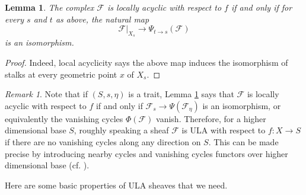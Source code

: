 \documentclass[]{pcmi}
\theoremstyle{plain}
\newtheorem{lem}[equation]{Lemma}
\theoremstyle{remark}
\newtheorem{rmk}[equation]{Remark}
\theoremstyle{definition}
\newcommand{\mF}{{\mathcal F}}
\begin{document}
\begin{lem}\label{LA reform}
The complex $\mF$ is locally acyclic with respect to $f$ if and only if for every $s$ and $t$ as above, the natural map 
\begin{equation}\label{sp}
\mF|_{X_s}\to \Psi_{t\to s}(\mF)
\end{equation}
is an isomorphism. 
\end{lem}
\begin{proof}Indeed, local acyclicity says the above map induces the isomorphism of stalks at every geometric point $x$ of $X_s$.
\end{proof}
\begin{rmk}\label{LA explanation}
Note that if $(S,s,\eta)$ is a trait, Lemma \ref{LA reform} says that $\mF$ is locally acyclic with respect to $f$ if and only if $\mF_s\to \Psi(\mF_\eta)$ is an isomorphism, or equivalently the vanishing cycles $\Phi(\mF)$ vanish. 
Therefore, for a higher dimensional base $S$, roughly speaking a sheaf $\mF$ is ULA with respect to $f: X\to S$ if there are no vanishing cycles along any direction on $S$. This can be made precise by introducing  nearby cycles and vanishing cycles functors over higher dimensional base (cf. \cite[Example 1.7(b)]{Il3}). 
\end{rmk}



Here are some basic properties of ULA sheaves that we need.
\end{document}
